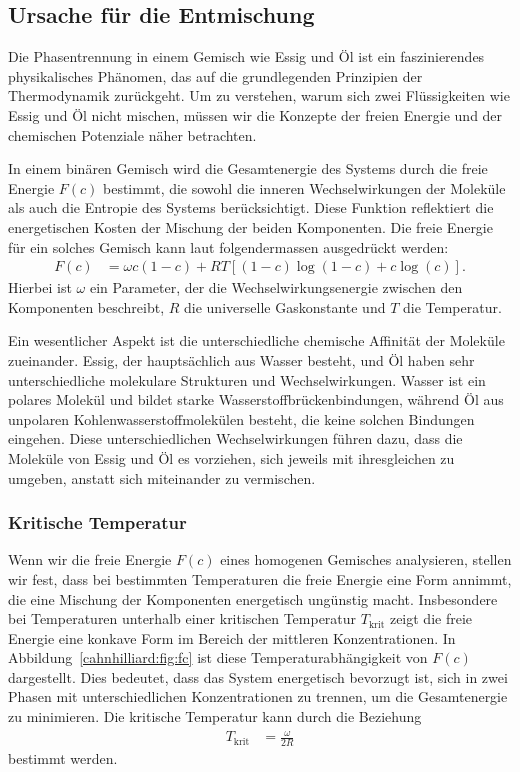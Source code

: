 \subsection{Ursache für die Entmischung}

Die Phasentrennung in einem Gemisch wie Essig und Öl
ist ein faszinierendes physikalisches Phänomen,
das auf die grundlegenden Prinzipien der Thermodynamik zurückgeht.
Um zu verstehen,
warum sich zwei Flüssigkeiten wie Essig und Öl nicht mischen,
müssen wir die Konzepte der freien Energie und
der chemischen Potenziale näher betrachten.

In einem binären Gemisch wird die Gesamtenergie des Systems
durch die freie Energie $F(c)$ bestimmt,
die sowohl die inneren Wechselwirkungen der Moleküle
als auch die Entropie des Systems berücksichtigt.
Diese Funktion reflektiert die energetischen Kosten der Mischung der beiden Komponenten.
Die freie Energie für ein solches Gemisch kann laut \cite{cahnhilliard:deriv}
folgendermassen ausgedrückt werden:
\begin{align*}
F(c)
&=
\omega c (1 - c) + R T \left[ (1-c) \log(1-c) + c \log(c) \right].
\end{align*}
Hierbei ist $\omega$ ein Parameter,
der die Wechselwirkungsenergie zwischen den Komponenten beschreibt,
$R$ die universelle Gaskonstante und
$T$ die Temperatur.

Ein wesentlicher Aspekt ist die unterschiedliche chemische Affinität
der Moleküle zueinander.
Essig,
der hauptsächlich aus Wasser besteht,
und Öl haben sehr unterschiedliche molekulare Strukturen und Wechselwirkungen.
Wasser ist ein polares Molekül und bildet starke Wasserstoffbrückenbindungen,
während Öl aus unpolaren Kohlenwasserstoffmolekülen besteht,
die keine solchen Bindungen eingehen.
Diese unterschiedlichen Wechselwirkungen führen dazu,
dass die Moleküle von Essig und Öl es vorziehen,
sich jeweils mit ihresgleichen zu umgeben,
anstatt sich miteinander zu vermischen.

\subsubsection{Kritische Temperatur}
Wenn wir die freie Energie $F(c)$ eines homogenen Gemisches analysieren,
stellen wir fest,
dass bei bestimmten Temperaturen die freie Energie eine Form annimmt,
die eine Mischung der Komponenten energetisch ungünstig macht.
Insbesondere bei Temperaturen unterhalb einer kritischen Temperatur $T_\text{krit}$
zeigt die freie Energie eine konkave Form im Bereich der mittleren Konzentrationen.
In Abbildung~\ref{cahnhilliard:fig:fc}
ist diese Temperaturabhängigkeit von $F(c)$ dargestellt.
Dies bedeutet,
dass das System energetisch bevorzugt ist,
sich in zwei Phasen mit unterschiedlichen Konzentrationen zu trennen,
um die Gesamtenergie zu minimieren.
Die kritische Temperatur kann durch die Beziehung
\begin{align*}
T_\text{krit}
&=
\frac{\omega}{2 R}
\end{align*}
bestimmt werden.

